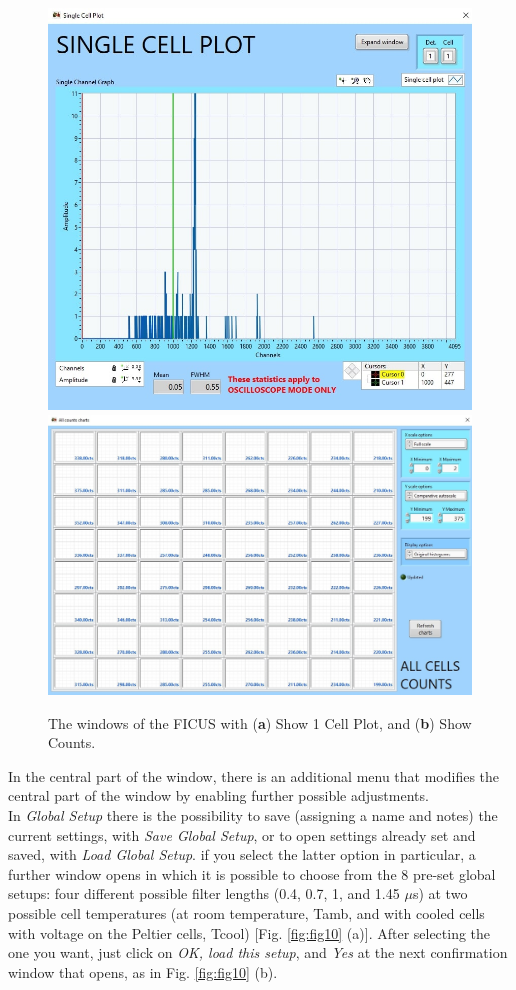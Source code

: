 \documentclass[a4paper,12pt,oneside,pdflatex,italian,final,twocolumn]{article}
\begin{document}
\begin{figure}[h]
\centering
\subfloat
{\includegraphics[width=.35\textwidth]{Capture43.jpg}} \quad
\subfloat
{\includegraphics[width=.55\textwidth]{Capture42.jpg}} \\
\caption{The windows of the FICUS with (\textbf{a}) Show 1 Cell Plot, and (\textbf{b}) Show Counts.}\label{fig:fig9}
\end{figure}

In the central part of the window, there is an additional menu that modifies the central part of the window by enabling further possible adjustments. \\
In \textit{Global Setup} there is the possibility to save (assigning a name and notes) the current settings, with \textit{Save Global Setup}, or to open settings already set and saved, with \textit{Load Global Setup}. if you select the latter option in particular, a further window opens in which it is possible to choose from the 8 pre-set global setups: four different possible filter lengths (0.4, 0.7, 1, and 1.45 $\mu$s) at two possible cell temperatures (at room temperature, Tamb, and with cooled cells with voltage on the Peltier cells, Tcool) [Fig. \ref{fig:fig10} (a)]. After selecting the one you want, just click on \textit{OK, load this setup}, and \textit{Yes} at the next confirmation window that opens, as in Fig. \ref{fig:fig10} (b).
\end{document}

